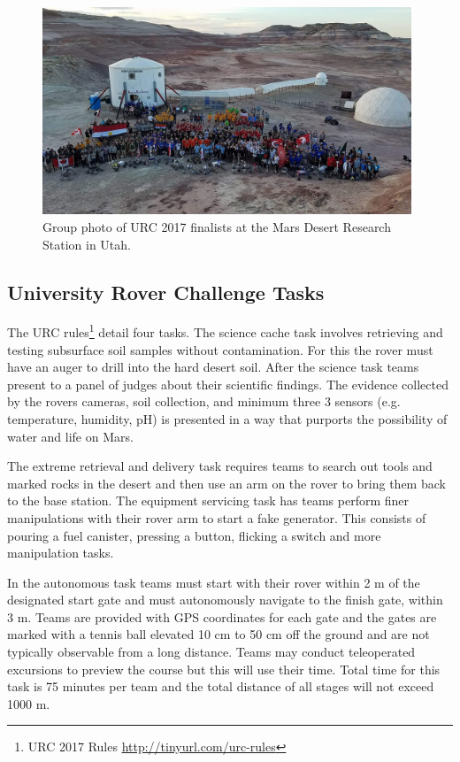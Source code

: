 \documentclass[runningheads,a4paper]{llncs}
\begin{document}
\begin{figure}
\centering
\includegraphics[height=6.2cm]{group_photo}
\caption{Group photo of URC 2017 finalists at the Mars Desert Research Station in Utah.}
\label{fig:group_photo}
\end{figure}

\subsection{University Rover Challenge Tasks}\label{urcrules}
The URC rules\footnote{URC 2017 Rules \url{http://tinyurl.com/urc-rules}} detail four tasks. The science cache task involves retrieving and testing subsurface soil samples without contamination. For this the rover must have an auger to drill into the hard desert soil. After the science task teams present to a panel of judges about their scientific findings. The evidence collected by the rovers cameras, soil collection, and minimum three 3 sensors (e.g. temperature, humidity, pH) is presented in a way that purports the possibility of water and life on Mars.

The extreme retrieval and delivery task requires teams to search out tools and marked rocks in the desert and then use an arm on the rover to bring them back to the base station. The equipment servicing task has teams perform finer manipulations with their rover arm to start a fake generator. This consists of pouring a fuel canister, pressing a button, flicking a switch and more manipulation tasks.

In the autonomous task teams must start with their rover within 2 m of the designated start gate and must autonomously navigate to the finish gate, within 3 m. Teams are provided with GPS coordinates for each gate and the gates are marked with a tennis ball elevated 10 cm to 50 cm off the ground and are not typically observable from a long distance. Teams may conduct teleoperated excursions to preview the course but this will use their time. Total time for this task is 75 minutes per team and the total distance of all stages will not exceed 1000 m.
\end{document}
